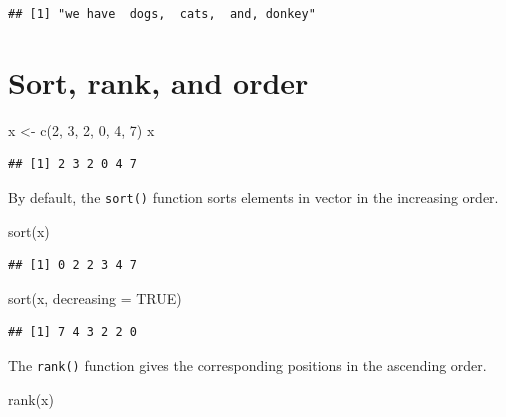 \documentclass[
]{book}
\newenvironment{Shaded}{\begin{snugshade}}{\end{snugshade}}
\newcommand{\AttributeTok}[1]{\textcolor[rgb]{0.77,0.63,0.00}{#1}}
\newcommand{\ConstantTok}[1]{\textcolor[rgb]{0.00,0.00,0.00}{#1}}
\newcommand{\DecValTok}[1]{\textcolor[rgb]{0.00,0.00,0.81}{#1}}
\newcommand{\FunctionTok}[1]{\textcolor[rgb]{0.00,0.00,0.00}{#1}}
\newcommand{\NormalTok}[1]{#1}
\newcommand{\OtherTok}[1]{\textcolor[rgb]{0.56,0.35,0.01}{#1}}
\begin{document}
\begin{verbatim}
## [1] "we have  dogs,  cats,  and, donkey"
\end{verbatim}

\hypertarget{sort-rank-and-order}{%
\section{Sort, rank, and order}\label{sort-rank-and-order}}

\begin{Shaded}
\begin{Highlighting}[]
\NormalTok{x }\OtherTok{\textless{}{-}} \FunctionTok{c}\NormalTok{(}\DecValTok{2}\NormalTok{, }\DecValTok{3}\NormalTok{, }\DecValTok{2}\NormalTok{, }\DecValTok{0}\NormalTok{, }\DecValTok{4}\NormalTok{, }\DecValTok{7}\NormalTok{) }
\NormalTok{x }
\end{Highlighting}
\end{Shaded}

\begin{verbatim}
## [1] 2 3 2 0 4 7
\end{verbatim}

By default, the \texttt{sort()} function sorts elements in vector in the increasing order.

\begin{Shaded}
\begin{Highlighting}[]
\FunctionTok{sort}\NormalTok{(x)}
\end{Highlighting}
\end{Shaded}

\begin{verbatim}
## [1] 0 2 2 3 4 7
\end{verbatim}

\begin{Shaded}
\begin{Highlighting}[]
\FunctionTok{sort}\NormalTok{(x, }\AttributeTok{decreasing =} \ConstantTok{TRUE}\NormalTok{)}
\end{Highlighting}
\end{Shaded}

\begin{verbatim}
## [1] 7 4 3 2 2 0
\end{verbatim}

The \texttt{rank()} function gives the corresponding positions in the ascending order.

\begin{Shaded}
\begin{Highlighting}[]
\FunctionTok{rank}\NormalTok{(x)}
\end{Highlighting}
\end{Shaded}
\end{document}
